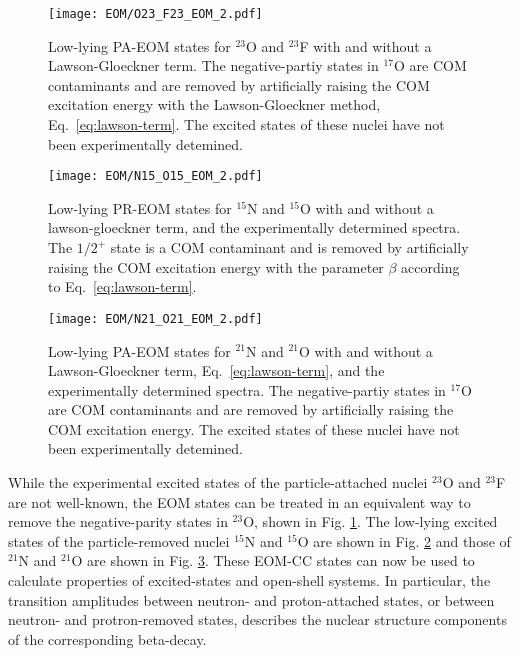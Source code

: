 \documentclass[thesis.tex]{subfiles}
\begin{document}
\begin{figure}[h]
  \texttt{[image: EOM/O23\_F23\_EOM\_2.pdf]}
  \caption{Low-lying PA-EOM states for $^{23}$O and $^{23}$F with and without a Lawson-Gloeckner term.  The negative-partiy states in $^{17}$O are COM contaminants and are removed by artificially raising the COM excitation energy with the Lawson-Gloeckner method, Eq.\ \eqref{eq:lawson-term}.  The excited states of these nuclei have not been experimentally detemined.}
  \label{fig:O23F23_spectra}
\end{figure}

\begin{figure}[h]
  \texttt{[image: EOM/N15\_O15\_EOM\_2.pdf]}
  \caption{Low-lying PR-EOM states for $^{15}$N and $^{15}$O with and without a lawson-gloeckner term, and the experimentally determined spectra.  The $1/2^{+}$ state is a COM contaminant and is removed by artificially raising the COM excitation energy with the parameter $\beta$ according to Eq.\ \eqref{eq:lawson-term}.}
  \label{fig:N15O15_spectra}
\end{figure}

\begin{figure}[h]
  \texttt{[image: EOM/N21\_O21\_EOM\_2.pdf]}
  \caption{Low-lying PA-EOM states for $^{21}$N and $^{21}$O with and without a Lawson-Gloeckner term, Eq.\ \eqref{eq:lawson-term}, and the experimentally determined spectra. The negative-partiy states in $^{17}$O are COM contaminants and are removed by artificially raising the COM excitation energy.  The excited states of these nuclei have not been experimentally detemined.}
  \label{fig:N21O21_spectra}
\end{figure}

While the experimental excited states of the particle-attached nuclei $^{23}$O and $^{23}$F are not well-known, the EOM states can be treated in an equivalent way to remove the negative-parity states in $^{23}$O, shown in Fig. \ref{fig:O23F23_spectra}.  The low-lying excited states of the particle-removed nuclei $^{15}$N and $^{15}$O are shown in Fig. \ref{fig:N15O15_spectra} and those of $^{21}$N and $^{21}$O are shown in Fig. \ref{fig:N21O21_spectra}.  These EOM-CC states can now be used to calculate properties of excited-states and open-shell systems.  In particular, the transition amplitudes between neutron- and proton-attached states, or between neutron- and protron-removed states, describes the nuclear structure components of the corresponding beta-decay.
\end{document}
